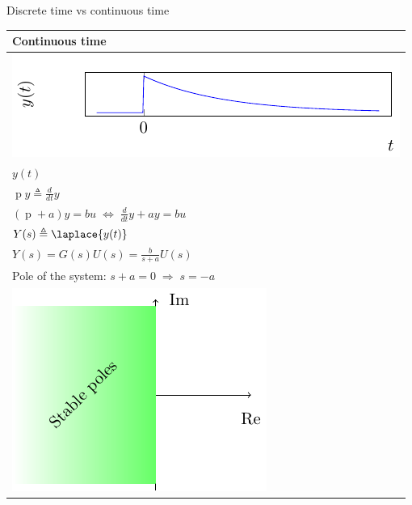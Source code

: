 \documentclass[presentation,aspectratio=169]{beamer}
\begin{document}
\begin{frame}[label={sec:orgea16d5c}]{Discrete time vs continuous time}
\begin{center}
\begin{tabular}{l}
Continuous time\\
\hline
\includegraphics[width=0.4\linewidth]{../../figures/cont-fcn}\\
\(y(t)\)\\
\(\operatorname{p} y \triangleq \frac{d}{dt} y\)\\
\((\operatorname{p}+a) y = bu \;\Leftrightarrow\; \frac{d}{dt}y + ay = bu\)\\
\(Y(s) \triangleq \laplace{y(t)}\)\\
\(Y(s) = G(s)U(s) = \frac{b}{s+a}U(s)\)\\
Pole of the system: \(s+a=0 \; \Rightarrow \; s = -a\)\\
\includegraphics[width=0.22\linewidth]{../../figures/cont-stable}\\
\hline
\end{tabular}
\end{center}
\end{frame}
\end{document}
